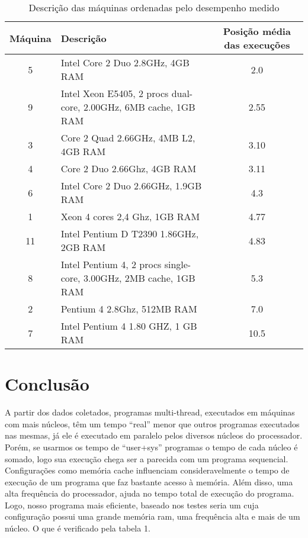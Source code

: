 \documentclass[10pt,a4paper]{article}
\begin{document}
\begin{table}[h!]
\caption{Descrição das máquinas ordenadas pelo desempenho medido}
\begin{tabular}{clc}
\hline
Máquina & Descrição & Posição média das execuções\\
\hline
5	&	Intel Core 2 Duo 2.8GHz, 4GB RAM & 2.0\\
9 &	Intel Xeon E5405, 2 procs dual-core, 2.00GHz, 6MB cache, 1GB
RAM & 2.55\\
3	&	Core 2 Quad 2.66GHz, 4MB L2, 4GB RAM & 3.10\\
4	&	Core 2 Duo 2.66Ghz, 4GB RAM & 3.11\\
6	&	Intel Core 2 Duo 2.66GHz, 1.9GB RAM & 4.3 \\
1	&	  Xeon 4 cores 2,4 Ghz, 1GB RAM & 4.77\\
11 &	Intel Pentium D T2390 1.86GHz, 2GB RAM & 4.83\\
8 &	Intel Pentium 4, 2 procs single-core, 3.00GHz, 2MB cache, 1GB
RAM & 5.3\\
2	&	Pentium 4 2.8Ghz, 512MB RAM & 7.0\\
7	&	Intel Pentium 4 1.80 GHZ, 1 GB RAM & 10.5\\
\hline
\end{tabular}
\end{table}


\section{Conclusão}
A partir dos dados coletados, programas multi-thread, executados em máquinas com mais núcleos, têm um tempo
``real'' menor que outros programas executados nas mesmas, já ele é executado em paralelo pelos
diversos núcleos do processador. Porém, se usarmos os tempo de ``user+sys''
programas o tempo de cada núcleo é somado, logo sua execução chega ser
a parecida com um programa sequencial.
Configurações como memória cache influenciam consideravelmente o tempo de
execução de um programa que faz bastante acesso à memória. Além disso,
 uma alta frequência do processador, ajuda no tempo total de execução
do programa.
Logo, nosso programa mais eficiente, baseado nos testes seria um cuja
configuração possui uma grande memória ram, uma frequência alta e mais
de um núcleo. O que é verificado pela tabela 1.

\begin{small}
  
\end{small}
\end{document}
